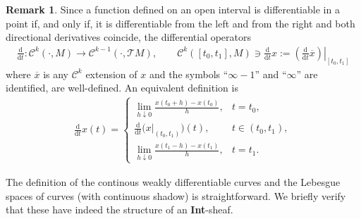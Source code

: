 \documentclass[preprint,12pt]{elsarticle}
\theoremstyle{definition}
\newtheorem{remark}[theorem]{Remark}
\begin{document}
\begin{remark}
Since a function defined on an open interval is differentiable in a point if, and only if, it is differentiable from the left and from the right and both directional derivatives coincide, the differential operators
\begin{align*}
\tfrac{\mathrm{d}}{\mathrm{d}t}:\mathcal{C}^k(\cdot,M)\to\mathcal{C}^{k-1}(\cdot,\mathcal{T}M),\qquad \mathcal{C}^k([t_0,t_1],M)\ni\tfrac{\mathrm{d}}{\mathrm{d}t}x := \left.\left(\tfrac{\mathrm{d}}{\mathrm{d}t}\overline{x}\right)\right\vert_{[t_0,t_1]}
\end{align*}
where $\overline{x}$ is any $\mathcal{C}^k$ extension of $x$ and the symbols ``$\infty-1$'' and ``$\infty$'' are identified, are well-defined. An equivalent definition is
\begin{align*}
\tfrac{\mathrm{d}}{\mathrm{d}t}x(t) = \begin{cases}
\lim_{h\downarrow 0}\frac{x(t_0+h)-x(t_0)}{h}, & t=t_0,\\
\tfrac{\mathrm{d}}{\mathrm{d}t}\big(x\vert_{(t_0,t_1)}\big)(t), & t\in(t_0,t_1),\\
\lim_{h\downarrow 0}\frac{x(t_1-h)-x(t_1)}{h}, & t=t_1. 
\end{cases}
\end{align*}
\end{remark}

The definition of the continous weakly differentiable curves and the Lebesgue spaces of curves (with continuous shadow) is straightforward. We briefly verify that these have indeed the structure of an \textbf{Int}-sheaf.
\end{document}
